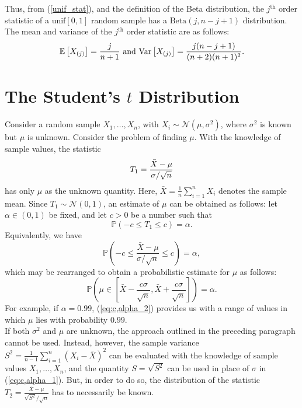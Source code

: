 \documentclass[a4paper,english,12pt]{article}
\begin{document}
\begin{exmp}
    Thus, from (\ref*{unif_stat}), and the definition of the Beta distribution, the $j^{\text{th}}$ order statistic of a $ \text{unif}\left[0,1\right] $ random sample has a $ \text{Beta}(j,n-j+1 ) $ distribution. The mean and variance of the $ j^{\text{th}} $ order statistic are as follows:
    \begin{equation}
     \mathbb{E} \left[X_{\left(j\right)}\right] = \frac{j}{n+1} ~ \text{and} ~
     \text{Var} \left[X_{\left(j\right)}\right] = \frac{j(n-j+1)}{(n+2)(n+1)^{2}}. \nonumber
    \end{equation}
\end{exmp}


\section{The Student's $ t $ Distribution}
Consider a random sample $ X_{1},\ldots,X_{n} $, with $ X_{i}\sim\mathcal{N}(\mu,\sigma^{2}) $, where $ \sigma^{2} $ is known but $ \mu $ is unknown. Consider the problem of finding $ \mu $. With the knowledge of sample values, the statistic 
\begin{equation}
T_{1}=\frac{\bar{X}-\mu}{\sigma/\sqrt{n}} \label{T_{1}}
\end{equation}
has only $ \mu $ as the unknown quantity. Here, $ \bar{X}=\frac{1}{n}\sum\limits_{i=1}^{n}X_{i} $ denotes the sample mean. Since $ T_{1} \sim \mathcal{N}(0,1) $, an estimate of $ \mu $ can be obtained as follows: let $ \alpha \in (0,1) $ be fixed, and let $ c>0 $ be a number such that
\begin{equation}
\mathbb{P}\left(-c  \leq T_{1} \leq c \right)=\alpha. \label{eq:c,alpha}
\end{equation}
Equivalently, we have
\begin{equation}
\mathbb{P}\left(-c \leq \frac{\bar{X}-\mu}{{\sigma}/\sqrt{n}} \leq c \right)=\alpha, \label{eq:c,alpha_1}
\end{equation}
which may be rearranged to obtain a probabilistic estimate for $ \mu $ as follows:
\begin{equation}
\mathbb{P}\left(\mu \in \left[\bar{X}-\frac{c\sigma}{\sqrt{n}}, \bar{X}+\frac{c\sigma}{\sqrt{n}}\right] \right)=\alpha. \label{eq:c,alpha_2}
\end{equation}
For example, if $ \alpha=0.99 $,  (\ref*{eq:c,alpha_2}) provides us with a range of values in which $ \mu $ lies with probability $ 0.99 $.
\\

If both $ \sigma^{2} $ and $ \mu $ are unknown, the approach outlined in the preceding paragraph cannot be used. Instead, however, the sample variance $ S^{2}=\frac{1}{n-1}\sum\limits_{i=1}^{n} \left(X_{i}-\bar{X}\right)^{2} $ can be evaluated with the knowledge of sample values $ X_{1},\ldots,X_{n} $, and the quantity $ S=\sqrt{S^{2}} $ can be used in place of $ \sigma $ in  (\ref*{eq:c,alpha_1}). But, in order to do so, the distribution of the statistic $ T_{2}=\frac{\bar{X}-\mu}{\sqrt{S^{2}}/\sqrt{n}} $ has to necessarily be known.
\\
\end{document}
